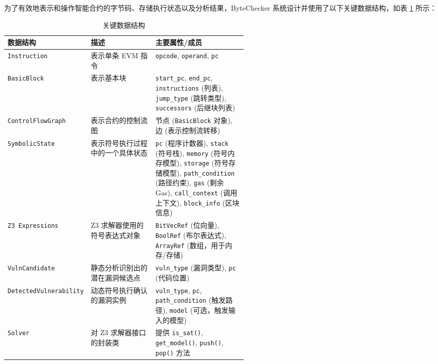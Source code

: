 \documentclass[print, master, vlined, timesmath]{DissertUESTC}
\begin{document}
为了有效地表示和操作智能合约的字节码、存储执行状态以及分析结果，ByteChecker 系统设计并使用了以下关键数据结构，如表 \ref{tab:data_structures} 所示：

\begin{table}[H] %
    \centering
    \caption{关键数据结构}
    \small %
    \begin{tabularx}{\linewidth}{@{} >{\RaggedRight\arraybackslash}p{0.28\linewidth} >{\RaggedRight\arraybackslash}p{0.27\linewidth} >{\RaggedRight\arraybackslash}X @{}} %
        \toprule
        \textbf{数据结构} & \textbf{描述} & \textbf{主要属性/成员} \\
        \midrule
        \texttt{Instruction} & 表示单条 EVM 指令 & \texttt{opcode}, \texttt{operand}, \texttt{pc} \\
        \texttt{BasicBlock} & 表示基本块 & \texttt{start\_pc}, \texttt{end\_pc}, \texttt{instructions} (列表), \texttt{jump\_type} (跳转类型), \texttt{successors} (后继块列表) \\
        \texttt{ControlFlowGraph} & 表示合约的控制流图 & 节点 (\texttt{BasicBlock} 对象), 边 (表示控制流转移) \\
        \texttt{SymbolicState} & 表示符号执行过程中的一个具体状态 & \texttt{pc} (程序计数器), \texttt{stack} (符号栈), \texttt{memory} (符号内存模型), \texttt{storage} (符号存储模型), \texttt{path\_condition} (路径约束), \texttt{gas} (剩余Gas), \texttt{call\_context} (调用上下文), \texttt{block\_info} (区块信息) \\
        \texttt{Z3 Expressions} & Z3 求解器使用的符号表达式对象 & \texttt{BitVecRef} (位向量), \texttt{BoolRef} (布尔表达式), \texttt{ArrayRef} (数组，用于内存/存储) \\
        \texttt{VulnCandidate} & 静态分析识别出的潜在漏洞候选点 & \texttt{vuln\_type} (漏洞类型), \texttt{pc} (代码位置) \\
        \texttt{DetectedVulnerability} & 动态符号执行确认的漏洞实例 & \texttt{vuln\_type}, \texttt{pc}, \texttt{path\_condition} (触发路径), \texttt{model} (可选，触发输入的模型)  \\
        \texttt{Solver} & 对 Z3 求解器接口的封装类 & 提供 \texttt{is\_sat()}, \texttt{get\_model()}, \texttt{push()}, \texttt{pop()} 方法 \\
        \bottomrule
    \end{tabularx}
    \label{tab:data_structures}
\end{table}
\end{document}
